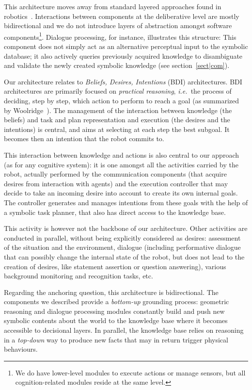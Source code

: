 \documentclass[preprint,3p,times]{elsarticle}
\newcommand{\ie}{{\textit{i.e.\ }}}
\begin{document}
This architecture moves away from standard layered approaches found in
robotics~\cite{Gat1998three, Volpe2001CLARAty, Goldberg2002}. Interactions
between components at the deliberative level are mostly bidirectional and we do
not introduce layers of abstraction amongst software components\footnote{We do
have lower-level modules to execute actions or manage sensors, but all
cognition-related modules reside at the same level.}. Dialogue processing, for
instance, illustrates this structure: This component does not simply act as an
alternative perceptual input to the symbolic database; it also
actively queries previously acquired knowledge to disambiguate and validate the
newly created symbolic knowledge (see section~\ref{sect|com}).

Our architecture relates to \emph{Beliefs, Desires, Intentions} (BDI)
architectures. BDI architectures are primarily focused on \emph{practical
reasoning}, \ie the process of deciding, step by step, which action to perform
to reach a goal (as summarized by Woolridge~\cite{Woolridge1999}). The
management of the interaction between knowledge (the beliefs) and task and plan
representation and execution (the desires and the intentions) is central, and
aims at selecting at each step the best subgoal. It becomes then an intention
that the robot commits to.

This interaction between knowledge and actions is also central to our approach
(as for any cognitive system): it is one amongst all the activities carried by
the robot, actually performed by the communication components (that acquire
desires from interaction with agents) and the execution controller that may
decide to take an incoming desire into account to create its own internal
goals. The controller generates and manages intentions from these goals with
the help of a symbolic task planner, that also has direct access to the
knowledge base.

This activity is however not the backbone of our architecture. Other
activities are conducted in parallel, without being explicitly considered as
desires: assessment of the situation and the environment, dialogue (including
performative dialogue that can possibly change the internal state of the robot,
but does not lead to the creation of desires, like statement assertion or
question answering), various background monitoring and recognition tasks, etc.

Regarding the anchoring question, this architecture is bidirectional. The
components we described provide a \textit{bottom-up} grounding process:
geometric reasoning and dialogue processing modules constantly build and push
new symbolic contents about the world to the knowledge base where it becomes
accessible to decisional layers. In parallel, the knowledge base relies on
reasoning in a \textit{top-down} way to produce new facts that may in return
trigger physical behaviours.
\end{document}
